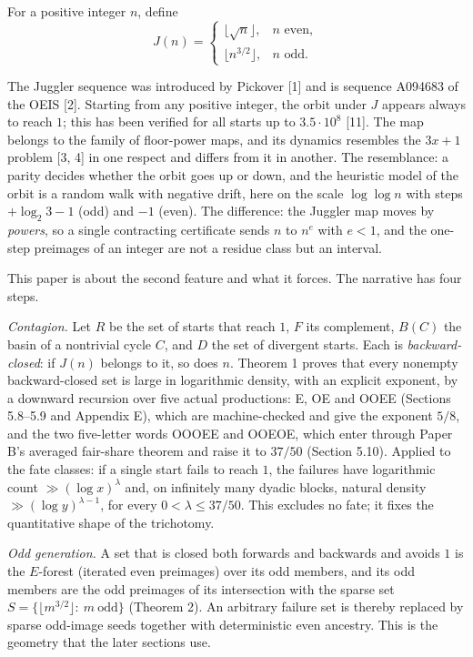 \documentclass[11pt,a4paper]{article}
\begin{document}
For a positive integer \(n\), define \[
J(n)=\begin{cases}
\lfloor\sqrt n\rfloor,&n\text{ even},\\
\lfloor n^{3/2}\rfloor,&n\text{ odd}.
\end{cases}
\]

The Juggler sequence was introduced by Pickover {[}1{]} and is sequence
A094683 of the OEIS {[}2{]}. Starting from any positive integer, the
orbit under \(J\) appears always to reach \(1\); this has been verified
for all starts up to \(3.5\cdot 10^8\) {[}11{]}. The map belongs to the
family of floor-power maps, and its dynamics resembles the \(3x+1\)
problem {[}3, 4{]} in one respect and differs from it in another. The
resemblance: a parity decides whether the orbit goes up or down, and the
heuristic model of the orbit is a random walk with negative drift, here
on the scale \(\log\log n\) with steps \(+\log_2 3-1\) (odd) and \(-1\)
(even). The difference: the Juggler map moves by \emph{powers}, so a
single contracting certificate sends \(n\) to \(n^{e}\) with \(e<1\),
and the one-step preimages of an integer are not a residue class but an
interval.

This paper is about the second feature and what it forces. The narrative
has four steps.

\emph{Contagion.} Let \(R\) be the set of starts that reach \(1\), \(F\)
its complement, \(B(C)\) the basin of a nontrivial cycle \(C\), and
\(D\) the set of divergent starts. Each is \emph{backward-closed}: if
\(J(n)\) belongs to it, so does \(n\). Theorem 1 proves that every
nonempty backward-closed set is large in logarithmic density, with an
explicit exponent, by a downward recursion over five actual productions:
E, OE and OOEE (Sections 5.8--5.9 and Appendix E), which are
machine-checked and give the exponent \(5/8\), and the two five-letter
words OOOEE and OOEOE, which enter through Paper B's averaged fair-share
theorem and raise it to \(37/50\) (Section 5.10). Applied to the fate
classes: if a single start fails to reach \(1\), the failures have
logarithmic count \(\gg(\log x)^\lambda\) and, on infinitely many dyadic
blocks, natural density \(\gg(\log y)^{\lambda-1}\), for every
\(0<\lambda\le37/50\). This excludes no fate; it fixes the quantitative
shape of the trichotomy.

\emph{Odd generation.} A set that is closed both forwards and backwards
and avoids \(1\) is the \(E\)-forest (iterated even preimages) over its
odd members, and its odd members are the odd preimages of its
intersection with the sparse set \(S=\{\lfloor m^{3/2}\rfloor:\ m\
\text{odd}\}\) (Theorem 2). An arbitrary failure set is thereby replaced
by sparse odd-image seeds together with deterministic even ancestry.
This is the geometry that the later sections use.
\end{document}
